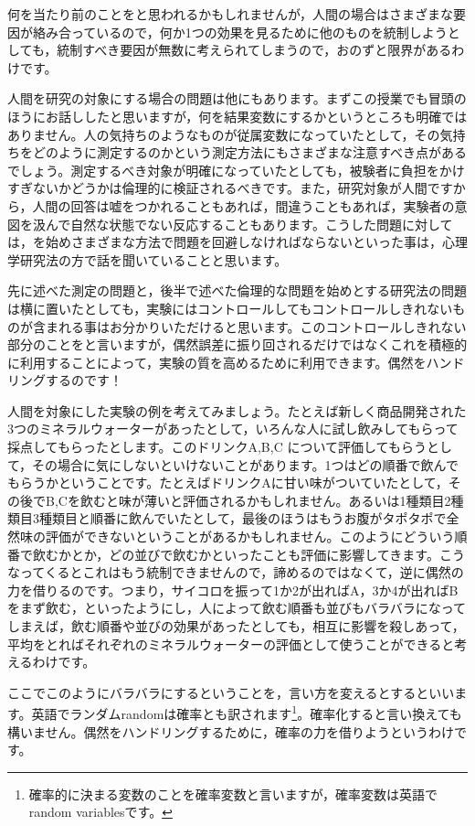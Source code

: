 \documentclass{ltjbook}
\begin{document}
何を当たり前のことをと思われるかもしれませんが，人間の場合はさまざまな要因が絡み合っているので，何か1つの効果を見るために他のものを統制しようとしても，統制すべき要因が無数に考えられてしまうので，おのずと限界があるわけです。

人間を研究の対象にする場合の問題は他にもあります。まずこの授業でも冒頭のほうにお話ししたと思いますが，何を結果変数にするかというところも明確ではありません。人の気持ちのようなものが従属変数になっていたとして，その気持ちをどのように測定するのかという測定方法にもさまざまな注意すべき点があるでしょう。測定するべき対象が明確になっていたとしても，被験者に負担をかけすぎないかどうかは倫理的に検証されるべきです。また，研究対象が人間ですから，人間の回答は嘘をつかれることもあれば，間違うこともあれば，実験者の意図を汲んで自然な状態でない反応することもあります。こうした問題に対しては，を始めさまざまな方法で問題を回避しなければならないといった事は，心理学研究法の方で話を聞いていることと思います。

先に述べた測定の問題と，後半で述べた倫理的な問題を始めとする研究法の問題は横に置いたとしても，実験にはコントロールしてもコントロールしきれないものが含まれる事はお分かりいただけると思います。このコントロールしきれない部分のことをと言いますが，偶然誤差に振り回されるだけではなくこれを積極的に利用することによって，実験の質を高めるために利用できます。偶然をハンドリングするのです！

人間を対象にした実験の例を考えてみましょう。たとえば新しく商品開発された3つのミネラルウォーターがあったとして，いろんな人に試し飲みしてもらって採点してもらったとします。このドリンクA,B,C について評価してもらうとして，その場合に気にしないといけないことがあります。1つはどの順番で飲んでもらうかということです。たとえばドリンクAに甘い味がついていたとして，その後でB,Cを飲むと味が薄いと評価されるかもしれません。あるいは1種類目2種類目3種類目と順番に飲んでいたとして，最後のほうはもうお腹がタポタポで全然味の評価ができないということがあるかもしれません。このようにどういう順番で飲むかとか，どの並びで飲むかといったことも評価に影響してきます。こうなってくるとこれはもう統制できませんので，諦めるのではなくて，逆に偶然の力を借りるのです。つまり，サイコロを振って1か2が出ればA，3か4が出ればBをまず飲む，といったようにし，人によって飲む順番も並びもバラバラになってしまえば，飲む順番や並びの効果があったとしても，相互に影響を殺しあって，平均をとればそれぞれのミネラルウォーターの評価として使うことができると考えるわけです。

ここでこのようにバラバラにするということを，言い方を変えるとするといいます。英語でランダムrandomは確率とも訳されます\footnote{確率的に決まる変数のことを確率変数と言いますが，確率変数は英語でrandom variablesです。}。確率化すると言い換えても構いません。偶然をハンドリングするために，確率の力を借りようというわけです。
\end{document}
